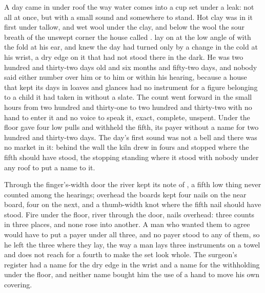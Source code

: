
A day came in under  roof the way water comes into a cup set under a leak: not all at once, but with a small sound and somewhere to stand. Hot clay was in it first under tallow, and wet wool under the clay, and below the wool the sour  breath of the unswept corner the house called .  lay on  at the low angle of  with the fold at his ear, and knew the day had turned only by a change in the cold at his wrist, a dry edge on it that had not stood there in the dark. He was two hundred and thirty-two days old and six months and fifty-two days, and nobody said either number over him or to him or within his hearing, because a house that kept its days in loaves and glances had no instrument for a figure belonging to a child it had taken in without a slate. The count went forward in the small hours from two hundred and thirty-one to two hundred and thirty-two with no hand to enter it and no voice to speak it, exact, complete, unspent. Under the floor  gave four low pulls and withheld the fifth, its payer without a name for two hundred and thirty-two days. The day's first sound was not a bell and there was no market in it: behind the wall the kiln drew in fours and stopped where the fifth should have stood, the stopping standing where it stood with nobody under any roof to put a name to it.

Through the finger's-width door the river kept its note of , a fifth low thing never counted among the hearings; overhead the boards kept four nails on the near board, four on the next, and a thumb-width knot where the fifth nail should have stood. Fire under the floor, river through the door, nails overhead: three counts in three places, and none rose into another. A man who wanted them to agree would have to put a payer under all three, and no payer stood to any of them, so he left the three where they lay, the way a man lays three instruments on a towel and does not reach for a fourth to make the set look whole. The surgeon's register had a name for the dry edge in the wrist and a name for the withholding under the floor, and neither name bought him the use of a hand to move his own covering.

